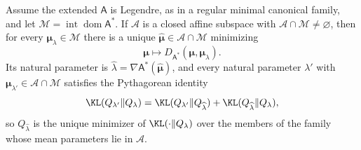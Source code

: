Assume the extended \(\mathsf A\) is Legendre, as in a regular minimal
canonical family, and let
\(\mathcal M=\operatorname{int}\operatorname{dom}\mathsf A^\ast\). If
\(\mathscr A\) is a closed affine subspace with
\(\mathscr A\cap\mathcal M\neq\varnothing\), then for every
\(\boldsymbol\mu_\lambda\in\mathcal M\) there is a unique
\(\widehat{\boldsymbol\mu}\in\mathscr A\cap\mathcal M\) minimizing
\begin{equation}
\boldsymbol\mu\longmapsto
D_{\mathsf A^\ast}(\boldsymbol\mu,\boldsymbol\mu_\lambda).
\label{eq:exp-mean-projection}
\end{equation}
Its natural parameter is
\(\widehat\lambda=\nabla\mathsf A^\ast(\widehat{\boldsymbol\mu})\), and every
natural parameter \(\lambda'\) with \(\boldsymbol\mu_{\lambda'}\in\mathscr A\cap\mathcal M\)
satisfies the Pythagorean identity
\begin{equation}
\KL(Q_{\lambda'}\Vert Q_\lambda)
=\KL(Q_{\lambda'}\Vert Q_{\widehat\lambda})
+\KL(Q_{\widehat\lambda}\Vert Q_\lambda),
\label{eq:exp-projection-pythagorean}
\end{equation}
so \(Q_{\widehat\lambda}\) is the unique minimizer of
\(\KL(\cdot\Vert Q_\lambda)\) over the members of the family whose mean
parameters lie in \(\mathscr A\). 


